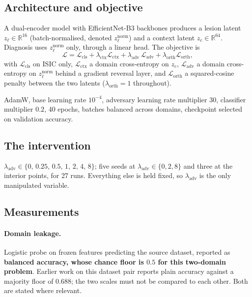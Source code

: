 \documentclass[11pt,a4paper]{article}
\newcommand{\lam}{\lambda_{\mathrm{adv}}}
\begin{document}
\subsection{Architecture and objective}

A dual-encoder model with EfficientNet-B3 backbones produces a lesion latent
$z_{\ell} \in \mathbb{R}^{16}$ (batch-normalised, denoted
$z_{\ell}^{\mathrm{norm}}$) and a context latent $z_{c} \in \mathbb{R}^{64}$.
Diagnosis uses $z_{\ell}^{\mathrm{norm}}$ only, through a linear head. The
objective is
\begin{equation}
\mathcal{L} = \mathcal{L}_{\mathrm{cls}}
+ \lambda_{\mathrm{ctx}}\mathcal{L}_{\mathrm{ctx}}
+ \lam\,\mathcal{L}_{\mathrm{adv}}
+ \lambda_{\mathrm{orth}}\mathcal{L}_{\mathrm{orth}},
\end{equation}
with $\mathcal{L}_{\mathrm{cls}}$ on ISIC only, $\mathcal{L}_{\mathrm{ctx}}$ a
domain cross-entropy on $z_c$, $\mathcal{L}_{\mathrm{adv}}$ a domain
cross-entropy on $z_{\ell}^{\mathrm{norm}}$ behind a gradient reversal layer,
and $\mathcal{L}_{\mathrm{orth}}$ a squared-cosine penalty between the two
latents ($\lambda_{\mathrm{orth}} = 1$ throughout).

AdamW, base learning rate $10^{-4}$, adversary learning rate multiplier $30$,
classifier multiplier $0.2$, 40 epochs, batches balanced across domains,
checkpoint selected on validation accuracy.

\subsection{The intervention}

$\lam \in \{0,\,0.25,\,0.5,\,1,\,2,\,4,\,8\}$; five seeds at
$\lam \in \{0, 2, 8\}$ and three at the interior points, for 27 runs.
Everything else is held fixed, so $\lam$ is the only manipulated variable.

\subsection{Measurements}

\paragraph{Domain leakage.} Logistic probe on frozen features predicting the
source dataset, reported as \textbf{balanced accuracy, whose chance floor is
$0.5$ for this two-domain problem}. Earlier work on this dataset pair reports
plain accuracy against a majority floor of $0.688$; the two scales must not be
compared to each other. Both are stated where relevant.
\end{document}
